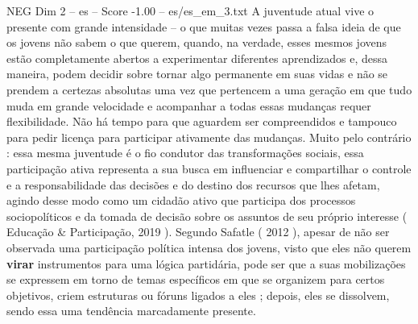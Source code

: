 \begin{textsample}{NEG Dim 2 – es – Score -1.00 – es/es\_em\_3.txt}
A juventude atual vive o presente com grande intensidade – o que muitas vezes passa a falsa ideia de que os jovens não sabem o que querem, quando, na verdade, esses mesmos jovens estão completamente abertos a experimentar diferentes aprendizados e, dessa maneira, podem decidir sobre tornar algo permanente em suas vidas e não se prendem a certezas absolutas uma vez que pertencem a uma geração em que tudo muda em grande velocidade e acompanhar a todas essas mudanças requer flexibilidade.
Não há tempo para que aguardem ser compreendidos e tampouco para pedir licença para participar ativamente das mudanças.
Muito pelo contrário : essa mesma juventude é o fio condutor das transformações sociais, essa participação ativa representa a sua busca em influenciar e compartilhar o controle e a responsabilidade das decisões e do destino dos recursos que lhes afetam, agindo desse modo como um cidadão ativo que participa dos processos sociopolíticos e da tomada de decisão sobre os assuntos de seu próprio interesse ( Educação \& Participação, 2019 ).
Segundo Safatle ( 2012 ), apesar de não ser observada uma participação política intensa dos jovens, visto que eles não querem \textbf{virar} instrumentos para uma lógica partidária, pode ser que a suas mobilizações se expressem em torno de temas específicos em que se organizem para certos objetivos, criem estruturas ou fóruns ligados a eles ; depois, eles se dissolvem, sendo essa uma tendência marcadamente presente.

\end{textsample}
